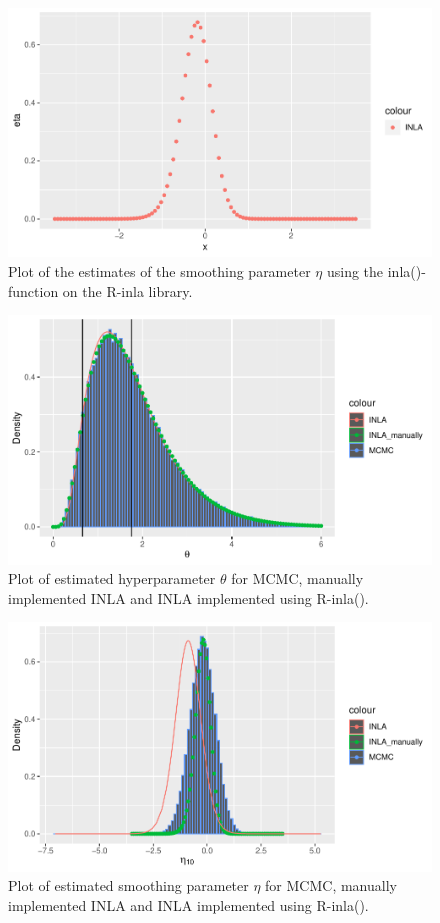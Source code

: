 \begin{figure}[h]
    \centering
    \includegraphics{Images/R_inla_eta.pdf}
    \caption{Plot of the estimates of the smoothing parameter $\eta$ using the inla()-function on the R-inla library.}
    \label{fig:r_inla_eta}
\end{figure}

\begin{figure}[h]
    \centering
    \includegraphics{Images/theta_comparison.pdf}
    \caption{Plot of estimated hyperparameter $\theta$ for MCMC, manually implemented INLA and INLA implemented using R-inla().}
    \label{fig:theta_comparison}
\end{figure}

\begin{figure}[h]
    \centering
    \includegraphics{Images/smoothing_comparison.pdf}
    \caption{Plot of estimated smoothing parameter $\eta$ for MCMC, manually implemented INLA and INLA implemented using R-inla().}
    \label{fig:smoothing_comparison}
\end{figure}
